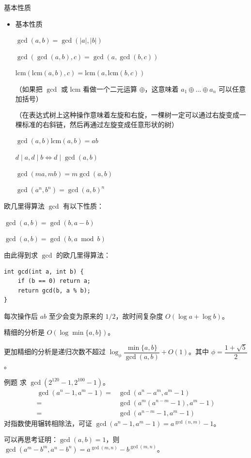 \documentclass [hyperref={bookmarksdepth=4}, aspectratio=169] {beamer}
\theoremstyle {fy}
\begin{document}
\begin{frame}{基本性质}
\begin{itemize}
    \item 基本性质

  $\gcd(a,b)=\gcd(|a|,|b|)$

  $\gcd(\gcd(a,b),c)=\gcd(a,\gcd(b,c))$

  $\mathrm{lcm}(\mathrm{lcm}(a,b),c)=\mathrm{lcm}(a,\mathrm{lcm}(b,c))$

  （如果把 $\gcd$ 或 $\mathrm{lcm}$ 看做一个二元运算 $\oplus$，这意味着 $a_1\oplus\dots\oplus a_n$ 可以任意加括号）

  （在表达式树上这种操作意味着左旋和右旋，一棵树一定可以通过右旋变成一棵标准的右斜链，然后再通过左旋变成任意形状的树）

  $\gcd(a,b)\mathrm{lcm}(a,b)=ab$

  $d\mid a,d\mid b\iff d\mid\gcd(a,b)$

  $\gcd(ma,mb)=m\gcd(a,b)$

  $\gcd(a^n,b^n)=\gcd(a,b)^n$
\end{itemize}
\end{frame}

\begin{frame}{欧几里得算法}
$\gcd$ 有以下性质：

$\gcd(a,b)=\gcd(b,a-b)$

$\gcd(a,b)=\gcd(b,a\bmod b)$

由此得到求 $\gcd$ 的欧几里得算法：

\begin{lstlisting}
int gcd(int a, int b) {
    if (b == 0) return a;
    return gcd(b, a % b);
}
\end{lstlisting}

每次操作后 $ab$ 至少会变为原来的 $1/2$，故时间复杂度 $O(\log a+\log b)$。

精细的分析是 $O(\log\min\{a,b\})$。

更加精细的分析是递归次数不超过 $\log_{\phi}\dfrac{\min\{a,b\}}{\gcd(a,b)}+O(1)$。其中 $\phi=\dfrac{1+\sqrt{5}}{2}$。
\end{frame}

\begin{frame}{例题}
求 $\gcd(2^{120}-1,2^{100}-1)$。
$$
\begin{aligned}
\gcd(a^n-1,a^m-1)
=&\gcd(a^n-a^m,a^m-1)\\
=&\gcd(a^m(a^{n-m}-1),a^m-1)\\
=&\gcd(a^{n-m}-1,a^m-1)
\end{aligned}
$$
对指数使用辗转相除法，可证 $\gcd(a^n-1,a^m-1)=a^{\gcd(n,m)}-1$。

可以再思考证明：$\gcd(a,b)=1$，则 $\gcd(a^m-b^m,a^n-b^n)=a^{\gcd(m,n)}-b^{\gcd(m,n)}$。
\end{frame}
\end{document}
